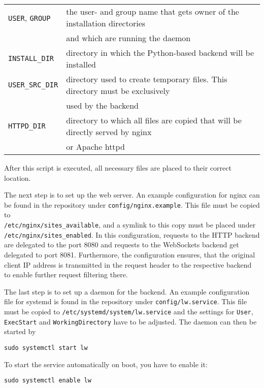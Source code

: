 \begin{tabular}{@{}l l}
\verb|USER|, \verb|GROUP| & the user- and group name that gets owner of the installation directories\\
                          & and which are running the daemon \\
\verb|INSTALL_DIR|        & directory in which the Python-based backend will be installed \\
\verb|USER_SRC_DIR|       & directory used to create temporary files. This directory must be exclusively\\
                          & used by the backend \\
\verb|HTTPD_DIR|          & directory to which all files are copied that will be directly served by nginx\\
                          & or Apache httpd\\
\end{tabular}

After this script is executed, all necessary files are placed to their correct location.

The next step is to set up the web server. An example configuration for nginx can be found
in the repository under \verb|config/nginx.example|. This file must be copied to\\ \verb|/etc/nginx/sites_available|,
and a symlink to this copy must be placed under\\ \verb|/etc/nginx/sites_enabled|. In this configuration, requests to
the HTTP backend are delegated to the port 8080 and requests to the WebSockets backend get delegated to port 8081.
Furthermore, the configuration ensures, that the original client IP address is transmitted in the request header to
the respective backend to enable further request filtering there.

The last step is to set up a daemon for the backend. An example configuration file for systemd is found in the
repository under \verb|config/lw.service|. This file must be copied to \verb|/etc/systemd/system/lw.service|
and the settings for \verb|User|, \verb|ExecStart| and \verb|WorkingDirectory| have to be adjusted.
The daemon can then be started by
\begin{verbatim}
sudo systemctl start lw
\end{verbatim}
To start the service automatically on boot, you have to enable it:
\begin{verbatim}
sudo systemctl enable lw
\end{verbatim}

